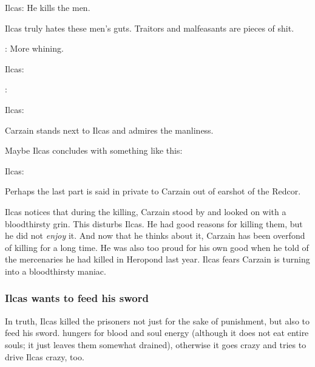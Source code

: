 \begin{garbage}
\begin{prose}
  Ilcas: 
  He kills the men. 
\end{prose}

Ilcas truly hates these men's guts. 
Traitors and malfeasants are pieces of shit. 

\begin{prose}
  \Esmerel: More whining. 
  
  Ilcas: 
  
  \Esmerel: 
  
  Ilcas: 
\end{prose}

Carzain stands next to Ilcas and admires the manliness. 

Maybe Ilcas concludes with something like this: 

\begin{prose}
  Ilcas: 
\end{prose}

Perhaps the last part is said in private to Carzain out of earshot of the Redcor. 

Ilcas notices that during the killing, Carzain stood by and looked on with a bloodthirsty grin. 
This disturbs Ilcas. 
He had good reasons for killing them, but he did not \emph{enjoy} it. 
And now that he thinks about it, Carzain has been overfond of killing for a long time. 
He was also too proud for his own good when he told of the mercenaries he had killed in Heropond last year. 
Ilcas fears Carzain is turning into a bloodthirsty maniac. 





\subsubsection{Ilcas wants to feed his sword}
In truth, Ilcas killed the prisoners not just for the sake of punishment, but also to feed his sword. 
\Telderain{} hungers for blood and soul energy (although it does not eat entire souls; it just leaves them somewhat drained), otherwise it goes crazy and tries to drive Ilcas crazy, too.  


\end{garbage}
